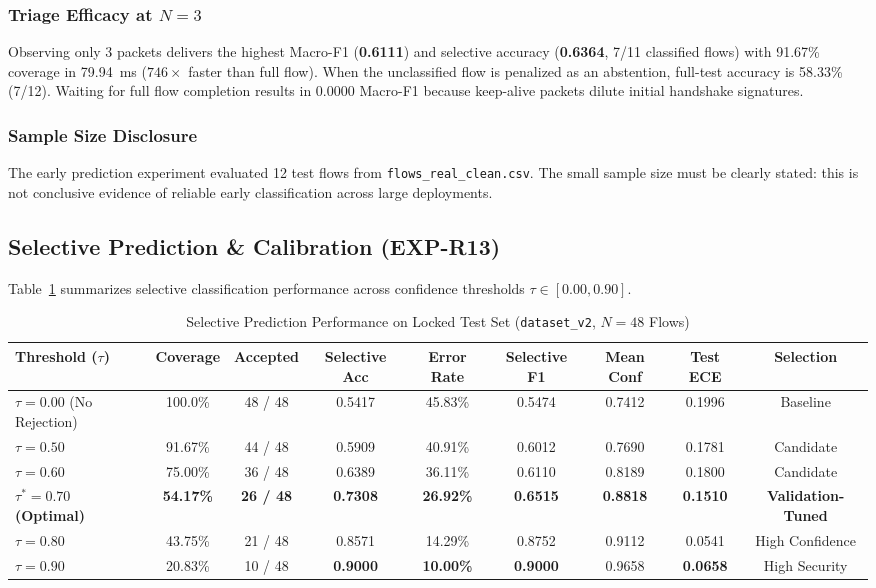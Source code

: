 \documentclass[conference]{IEEEtran}
\begin{document}
\subsubsection{Triage Efficacy at $N=3$}
Observing only 3 packets delivers the highest Macro-F1 (\textbf{0.6111}) and selective accuracy (\textbf{0.6364}, 7/11 classified flows) with 91.67\% coverage in 79.94~ms ($746\times$ faster than full flow). When the unclassified flow is penalized as an abstention, full-test accuracy is 58.33\% (7/12). Waiting for full flow completion results in 0.0000 Macro-F1 because keep-alive packets dilute initial handshake signatures.

\subsubsection{Sample Size Disclosure}
The early prediction experiment evaluated 12 test flows from \texttt{flows\_real\_clean.csv}. The small sample size must be clearly stated: this is not conclusive evidence of reliable early classification across large deployments.

\subsection{Selective Prediction \& Calibration (EXP-R13)}
Table~\ref{tab:selective_prediction} summarizes selective classification performance across confidence thresholds $\tau \in [0.00, 0.90]$.

\begin{table}[t]
\centering
\caption{Selective Prediction Performance on Locked Test Set (\texttt{dataset\_v2}, $N=48$ Flows)}
\label{tab:selective_prediction}
\footnotesize
\begin{tabularx}{\textwidth}{lcccccccc}
\toprule
\textbf{Threshold ($\tau$)} & \textbf{Coverage} & \textbf{Accepted} & \textbf{Selective Acc} & \textbf{Error Rate} & \textbf{Selective F1} & \textbf{Mean Conf} & \textbf{Test ECE} & \textbf{Selection} \\
\midrule
$\tau = 0.00$ (No Rejection) & 100.0\% & 48 / 48 & 0.5417 & 45.83\% & 0.5474 & 0.7412 & 0.1996 & Baseline \\
$\tau = 0.50$ & 91.67\% & 44 / 48 & 0.5909 & 40.91\% & 0.6012 & 0.7690 & 0.1781 & Candidate \\
$\tau = 0.60$ & 75.00\% & 36 / 48 & 0.6389 & 36.11\% & 0.6110 & 0.8189 & 0.1800 & Candidate \\
\textbf{$\tau^* = 0.70$ (Optimal)} & \textbf{54.17\%} & \textbf{26 / 48} & \textbf{0.7308} & \textbf{26.92\%} & \textbf{0.6515} & \textbf{0.8818} & \textbf{0.1510} & \textbf{Validation-Tuned} \\
$\tau = 0.80$ & 43.75\% & 21 / 48 & 0.8571 & 14.29\% & 0.8752 & 0.9112 & 0.0541 & High Confidence \\
$\tau = 0.90$ & 20.83\% & 10 / 48 & \textbf{0.9000} & \textbf{10.00\%} & \textbf{0.9000} & 0.9658 & \textbf{0.0658} & High Security \\
\bottomrule
\end{tabularx}
\end{table}
\end{document}
